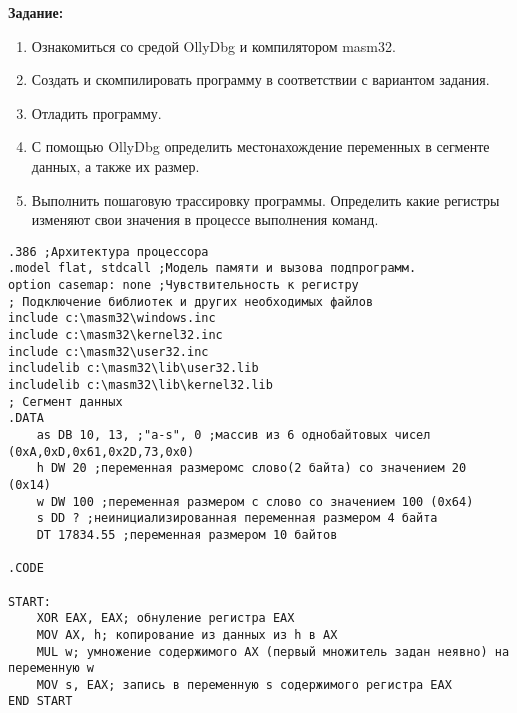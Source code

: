 \textbf{Задание:}

\begin{enumerate}
\def\labelenumi{\arabic{enumi}.}
\tightlist
\item
  Ознакомиться со средой OllyDbg и компилятором masm32.
\item
  Создать и скомпилировать программу в соответствии с вариантом задания.
\item
  Отладить программу.
\item
  С помощью OllyDbg определить местонахождение переменных в сегменте
  данных, а также их размер.
\item
  Выполнить пошаговую трассировку программы. Определить какие регистры
  изменяют свои значения в процессе выполнения команд.
\end{enumerate}

\begin{verbatim}
.386 ;Архитектура процессора
.model flat, stdcall ;Модель памяти и вызова подпрограмм.
option casemap: none ;Чувствительность к регистру
; Подключение библиотек и других необходимых файлов
include c:\masm32\windows.inc
include c:\masm32\kernel32.inc
include c:\masm32\user32.inc
includelib c:\masm32\lib\user32.lib
includelib c:\masm32\lib\kernel32.lib
; Сегмент данных
.DATA
    as DB 10, 13, ;"a-s", 0 ;массив из 6 однобайтовых чисел (0xA,0xD,0x61,0x2D,73,0x0)
    h DW 20 ;переменная размеромс слово(2 байта) со значением 20 (0x14)
    w DW 100 ;переменная размером с слово со значением 100 (0x64)
    s DD ? ;неинициализированная переменная размером 4 байта
    DT 17834.55 ;переменная размером 10 байтов 

.CODE

START:
    XOR EAX, EAX; обнуление регистра EAX
    MOV AX, h; копирование из данных из h в AX
    MUL w; умножение содержимого AX (первый множитель задан неявно) на переменную w
    MOV s, EAX; запись в переменную s содержимого регистра EAX
END START
\end{verbatim}
